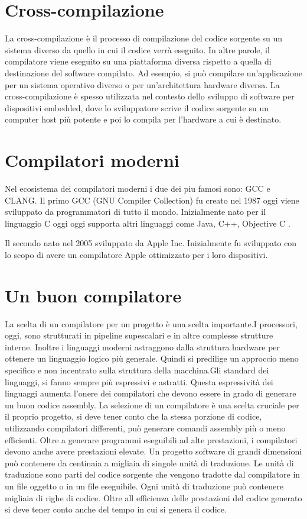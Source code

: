 \documentclass[12pt, a4paper]{report}
\begin{document}
\section{Cross-compilazione}
\label{Sec:Cross}
La cross-compilazione è il processo di compilazione del codice sorgente su un sistema diverso da quello in cui il codice verrà eseguito. In altre parole, il compilatore viene eseguito su una piattaforma diversa rispetto a quella di destinazione del software compilato. Ad esempio, si può compilare un'applicazione per un sistema operativo diverso o per un'architettura hardware diversa. La cross-compilazione è spesso utilizzata nel contesto dello sviluppo di software per dispositivi embedded, dove lo sviluppatore scrive il codice sorgente su un computer host più potente e poi lo compila per l'hardware a cui è destinato.


\section{Compilatori moderni}
Nel ecosistema dei compilatori moderni i due dei piu famosi sono: GCC e CLANG.
Il primo GCC (GNU Compiler Collection) fu creato nel 1987 oggi viene sviluppato da programmatori di tutto il mondo. Inizialmente nato per il linguaggio C oggi oggi supporta altri linguaggi come Java, C++, Objective C \cite{GCCstory}.

Il secondo nato nel 2005 sviluppato da Apple Inc. Inizialmente fu sviluppato con lo scopo di avere un compilatore Apple ottimizzato per i loro dispositivi\cite{ClangStory}.

\section{Un buon compilatore} %
La scelta di un compilatore per un progetto è una scelta importante.I processori, oggi, sono strutturati in pipeline supescalari e in altre complesse strutture interne. Inoltre i linguaggi moderni astraggono dalla struttura hardware per ottenere un linguaggio logico più generale. Quindi si predilige un approccio meno specifico e non incentrato sulla struttura della macchina.Gli standard dei linguaggi, si fanno sempre più espressivi e astratti. Questa espressività dei linguaggi aumenta l'onere dei compilatori che devono essere in grado di generare un buon codice assembly. La selezione di un compilatore è una scelta cruciale per il proprio progetto, si deve tener conto che la stessa porzione di codice, utilizzando compilatori differenti, può generare comandi assembly più o meno efficienti.
Oltre a generare programmi eseguibili ad alte prestazioni, i compilatori devono anche avere prestazioni elevate. Un progetto software di grandi dimensioni può contenere da centinaia a migliaia di singole unità di traduzione. Le unità di traduzione sono parti del codice sorgente che vengono tradotte dal compilatore in un file oggetto o in un file eseguibile. Ogni unità di traduzione può contenere migliaia di righe di codice. Oltre all efficienza delle prestazioni del codice generato si deve tener conto anche del tempo in cui si genera il codice.
\end{document}
